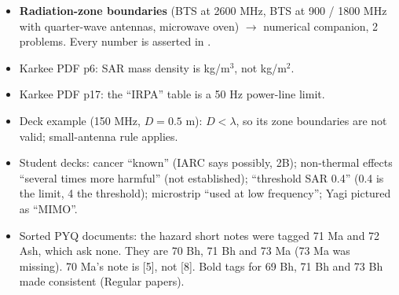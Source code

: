 \begin{itemize}
  \item \textbf{Radiation-zone boundaries} (BTS at 2600 MHz, BTS at 900 / 1800 MHz with
    quarter-wave antennas, microwave oven) $\rightarrow$ numerical companion, 2 problems. Every
    number is asserted in .
\end{itemize}

\begin{itemize}
  \item Karkee PDF p6: SAR mass density is kg/m$^3$, not kg/m$^2$.
  \item Karkee PDF p17: the ``IRPA'' table is a 50 Hz power-line limit.
  \item Deck example (150 MHz, $D = 0.5$ m): $D < \lambda$, so its zone boundaries are not
    valid; small-antenna rule applies.
  \item Student decks: cancer ``known'' (IARC says possibly, 2B); non-thermal effects ``several
    times more harmful'' (not established); ``threshold SAR 0.4'' (0.4 is the limit, 4 the
    threshold); microstrip ``used at low frequency''; Yagi pictured as ``MIMO''.
  \item Sorted PYQ documents: the hazard short notes were tagged 71 Ma and 72 Ash, which ask
    none. They are 70 Bh, 71 Bh and 73 Ma (73 Ma was missing). 70 Ma's note is [5], not [8].
    Bold tags for 69 Bh, 71 Bh and 73 Bh made consistent (Regular papers).
\end{itemize}
